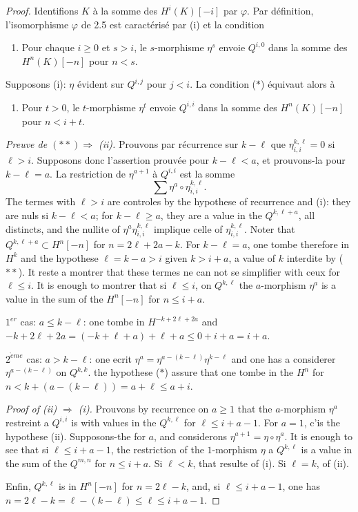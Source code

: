 \documentclass[11pt,a4paper]{article}
\theoremstyle{plain}
\theoremstyle{definition}
\begin{document}
\begin{proof}
Identifions $K$ \`a la somme des $H^i(K)[-i]$ par $\varphi$. Par d\'efinition, l'isomorphisme $\varphi$ de 2.5 est caract\'eris\'e par (i) et la condition
\begin{enumerate}[label=($*$)]
\item Pour chaque $i \geqslant 0$ et $s > i$, le $s$-morphisme $\eta^s$ envoie $Q^{i,0}$ dans la somme des $H^n(K)[-n]$ pour $n < s$.
\end{enumerate}
Supposons (i): $\eta$ \'evident sur $Q^{i,j}$ pour $j < i$. La condition ($*$) \'equivaut alors \`a
\begin{enumerate}[label=($**$)]
\item Pour $t > 0$, le $t$-morphisme $\eta^t$ envoie $Q^{i,i}$ dans la somme des $H^n(K)[-n]$ pour $n < i+t$.
\end{enumerate}

\emph{Preuve de $(**) \Rightarrow$ (ii).} Prouvons par r\'ecurrence sur $k-\ell$ que $\eta^{k,\ell}_{i,i} = 0$ si $\ell > i$. Supposons donc l'assertion prouv\'ee pour $k-\ell < a$, et prouvons-la pour $k-\ell = a$. La restriction de $\eta^{a+1}$ \`a $Q^{i,i}$ est la somme
\[
\sum \eta^a \circ \eta^{k,\ell}_{i,i}.
\]
The termes with $\ell > i$ are controles by the hypothese of recurrence and (i): they are nuls si $k-\ell < a$; for $k-\ell \geqslant a$, they are a value in the $Q^{k,\ell+a}$, all distincts, and the nullite of $\eta^a \eta^{k,\ell}_{i,i}$ implique celle of $\eta^{k,\ell}_{i,i}$. Noter that $Q^{k,\ell+a} \subset H^n[-n]$ for $n = 2\ell+2a-k$. For $k-\ell = a$, one tombe therefore in $H^k$ and the hypothese $\ell = k-a > i$ given $k > i+a$, a value of $k$ interdite by ($**$). It reste a montrer that these termes ne can not se simplifier with ceux for $\ell \leqslant i$. It is enough to montrer that si $\ell \leqslant i$, on $Q^{k,\ell}$ the $a$-morphism $\eta^a$ is a value in the sum of the $H^n[-n]$ for $n \leqslant i+a$.

$1^{er}$ cas: $a \leqslant k-\ell$: one tombe in $H^{-k+2\ell+2a}$ and $-k+2\ell+2a = (-k+\ell+a) + \ell + a \leqslant 0 + i + a = i+a$.

$2^{\grave{e}me}$ cas: $a > k-\ell$: one ecrit $\eta^a = \eta^{a-(k-\ell)} \eta^{k-\ell}$ and one has a considerer $\eta^{a-(k-\ell)}$ on $Q^{k,k}$. the hypothese ($*$) assure that one tombe in the $H^n$ for $n < k+(a-(k-\ell)) = a+\ell \leqslant a+i$.

\emph{Proof of (ii) $\Rightarrow$ (i).} Prouvons by recurrence on $a \geqslant 1$ that the $a$-morphism $\eta^a$ restreint a $Q^{i,i}$ is with values in the $Q^{k,\ell}$ for $\ell \leqslant i+a-1$. For $a=1$, c'is the hypothese (ii). Supposons-the for $a$, and considerons $\eta^{a+1} = \eta \circ \eta^a$. It is enough to see that si $\ell \leqslant i+a-1$, the restriction of the $1$-morphism $\eta$ a $Q^{k,\ell}$ is a value in the sum of the $Q^{m,n}$ for $n \leqslant i+a$. Si $\ell < k$, that resulte of (i). Si $\ell = k$, of (ii).

Enfin, $Q^{k,\ell}$ is in $H^n[-n]$ for $n = 2\ell-k$, and, si $\ell \leqslant i+a-1$, one has $n = 2\ell-k = \ell-(k-\ell) \leqslant \ell \leqslant i+a-1$.
\end{proof}
\end{document}
